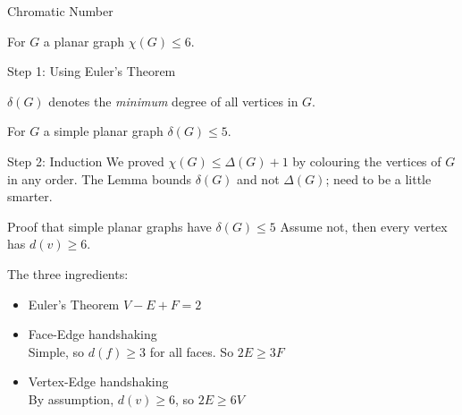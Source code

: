 \documentclass{beamer}
\begin{document}
\begin{frame}{Chromatic Number}
  \begin{theorem} For $G$ a planar graph $\chi(G)\leq 6$.
\end{theorem}

  \begin{block}{Step 1: Using Euler's Theorem}
    \begin{definition}$\delta(G)$ denotes the \emph{minimum} degree of all vertices in $G$.
      \end{definition}
    \begin{lemma}For $G$ a simple planar graph $\delta(G)\leq 5$.
    \end{lemma}  
        \end{block}
  
  \begin{block}{Step 2: Induction}
 We proved $\chi(G)\leq \Delta(G)+1$ by colouring the vertices of $G$ in any order.  The Lemma bounds $\delta(G)$ and not $\Delta(G)$; need to be a little smarter. 
\end{block}
    
\end{frame}

\begin{frame}{Proof that simple planar graphs have $\delta(G)\leq 5$}
  Assume not, then every vertex has $d(v)\geq 6$.
\begin{block}{The three ingredients:}
  \begin{itemize}
  \item Euler's Theorem $V-E+F=2$
  \item Face-Edge handshaking \\
    Simple, so $d(f)\geq 3$ for all faces. So $2E\geq 3F$
  \item Vertex-Edge handshaking \\
    By assumption, $d(v)\geq 6$, so $2E\geq 6V$
    \end{itemize}


\end{block}
 
\end{frame}
\end{document}
